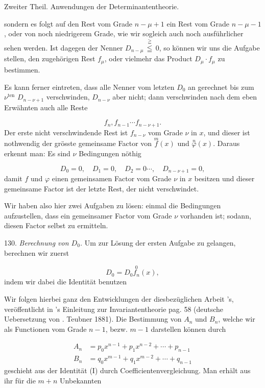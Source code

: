 Zweiter Theil. Anwendungen der Determinantentheorie.

sondern es folgt auf den Rest vom Grade $n-\mu+1$ ein Rest vom
Grade $n-\mu-1$, oder von noch niedrigerem Grade, wie wir sogleich
auch noch ausführlicher sehen werden. Ist dagegen der Nenner
$D_{n-\mu}\,\overset{\geqq}{\leqq}\,0$, so können wir uns die Aufgabe stellen, den zugehörigen
Rest $f_\mu$, oder vielmehr das Product $D_\mu \cdot f_\mu$ zu bestimmen.

Es kann ferner eintreten, dass alle Nenner vom letzten $D_0$ an
gerechnet bis zum $\nu^{\text{ten}}$ $D_{n-\nu+1}$ verschwinden, $D_{n-\nu}$ aber nicht; dann
verschwinden nach dem eben Erwähnten auch alle Reste

\[
f_n, f_{n-1}\cdots f_{n-\nu+1}.
\]
Der erste nicht verschwindende Rest ist $f_{n-\nu}$ vom Grade $\nu$ in $x$, und
dieser ist nothwendig der grösste gemeinsame Factor von $\overset{m}{f}(x)$ und
$\overset{n}{\varphi}(x)$. Daraus erkennt man: Es sind $\nu$ Bedingungen nöthig

\[
D_0 = 0, \quad D_1 = 0, \quad D_2 = 0 \cdots, \quad D_{n-\nu+1} = 0,
\]
damit $f$ und $\varphi$ einen gemeinsamen Factor vom Grade $\nu$ in $x$ besitzen
und dieser gemeinsame Factor ist der letzte Rest, der nicht ver\-schwindet.

Wir haben also hier zwei Aufgaben zu lösen: einmal die Be\-dingungen aufzustellen, dass ein gemeinsamer Factor vom Grade $\nu$
vorhanden ist; sodann, diesen Factor selbst zu ermitteln.

130. \textit{Berechnung von $D_0$.} Um zur Lösung der ersten Aufgabe zu
gelangen, berechnen wir zuerst

\[
D_0 = D_0\overset{0}{f_n}(x),
\]
indem wir dabei die Identität benutzen


Wir folgen hierbei ganz den Entwicklungen der diesbezüglichen Arbeit
's, veröffentlicht in 's Einleitung zur Invarianten\-theorie pag. 58 (deutsche Uebersetzung von . Teubner 1881).
Die Bestimmung von $A_n$ und $B_n$, welche wir als Functionen vom
Grade $n-1$, bezw. $m-1$ darstellen können durch

\[
\begin{aligned}
A_n &= p_0 x^{n-1} + p_1 x^{n-2} + \cdots + p_{n-1}\\
B_n &= q_0 x^{m-1} + q_1 x^{m-2} + \cdots + q_{n-1}
\end{aligned}
\]
geschieht aus der Identität (I) durch Coefficientenvergleichung. Man
erhält aus ihr für die $m+n$ Unbekannten

